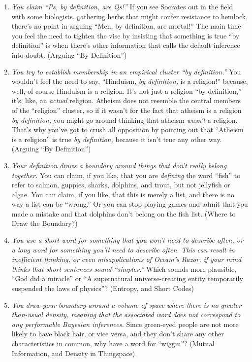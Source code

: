 \begin{enumerate}
\item {
 \textit{You claim ``Ps, by definition, are
Qs!''} If you see Socrates out in the field with some
biologists, gathering herbs that might confer resistance to hemlock,
there's no point in arguing ``Men, by
definition, are mortal!'' The main time you feel the
need to tighten the vise by insisting that something is true
``by definition'' is when
there's other information that calls the default
inference into doubt. (Arguing ``By
Definition'')}

\item {
 \textit{You try to establish membership in an empirical cluster
``by definition.''} You
wouldn't feel the need to say,
``Hinduism, \textit{by definition,} is a
religion!'' because, well, of course Hinduism is a
religion. It's not just a religion
``by definition,''
it's, like, an \textit{actual} religion. Atheism does
not resemble the central members of the
``religion'' cluster, so if it
wasn't for the fact that atheism is a religion
\textit{by definition,} you might go around thinking that atheism
\textit{wasn't} a religion. That's why
you've got to crush all opposition by pointing out that
``Atheism is a religion'' is true
\textit{by definition,} because it isn't true any other
way. (Arguing ``By Definition'')}

\item {
 \textit{Your definition draws a boundary around things that
don't really belong together.} You can claim, if you
like, that you are \textit{defining} the word
``fish'' to refer to salmon,
guppies, sharks, dolphins, and trout, but not jellyfish or algae. You
can claim, if you like, that this is merely a list, and there is no way
a list can be ``wrong.'' Or you can
stop playing games and admit that you made a mistake and that dolphins
don't belong on the fish list. (Where to Draw the
Boundary?)}

\item {
 \textit{You use a short word for something that you
won't need to describe often, or a long word for
something you'll need to describe often. This can
result in inefficient thinking, or even misapplications of
Occam's Razor, if your mind thinks that short sentences
sound ``simpler.''} Which sounds
more plausible, ``God did a
miracle'' or ``A supernatural
universe-creating entity temporarily suspended the laws of
physics''? (Entropy, and Short Codes)}

\item {
 \textit{You draw your boundary around a volume of space where
there is no greater-than-usual density, meaning that the associated
word does not correspond to any performable Bayesian inferences.} Since
green-eyed people are not more likely to have black hair, or vice
versa, and they don't share any other characteristics
in common, why have a word for
``wiggin''? (Mutual Information, and
Density in Thingspace)}


\end{enumerate}
